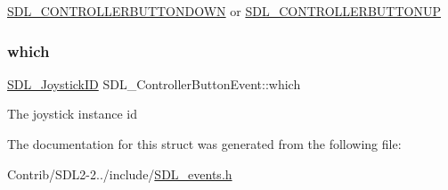 \mbox{\hyperlink{_s_d_l__events_8h_a3b589e89be6b35c02e0dd34a55f3fccaaafe044d5f92ac9608ded473218569474}{S\+D\+L\+\_\+\+C\+O\+N\+T\+R\+O\+L\+L\+E\+R\+B\+U\+T\+T\+O\+N\+D\+O\+WN}} or \mbox{\hyperlink{_s_d_l__events_8h_a3b589e89be6b35c02e0dd34a55f3fccaa8cb5a10b1ae0e185ef69a321d3d2d1be}{S\+D\+L\+\_\+\+C\+O\+N\+T\+R\+O\+L\+L\+E\+R\+B\+U\+T\+T\+O\+N\+UP}} \mbox{\label{struct_s_d_l___controller_button_event_a98777e88b5d5cae83eef16ffd4bcacc1}} 
\subsubsection{\texorpdfstring{which}{which}}
{\footnotesize\ttfamily \mbox{\hyperlink{_s_d_l__joystick_8h_a3c3d32500cb08f76ee8077983912c0bd}{S\+D\+L\+\_\+\+Joystick\+ID}} S\+D\+L\+\_\+\+Controller\+Button\+Event\+::which}

The joystick instance id 

The documentation for this struct was generated from the following file\+:\begin{DoxyCompactItemize}
\item 
Contrib/\+S\+D\+L2-\/2../include/\mbox{\hyperlink{_s_d_l__events_8h}{S\+D\+L\+\_\+events.\+h}}\end{DoxyCompactItemize}
